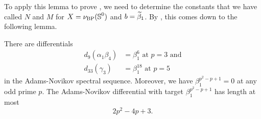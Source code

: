 


To apply this lemma to prove , we need to determine the constants that we have called $N$ and $M$ for $X = \nu_{\mathrm{BP}} (\operatorname{\mathbb{S}}^0)$ and $b = \wt{\beta}_1$. By , this comes down to the following lemma. 

\begin{lem}[Ravenel]\label{lemm:beta1-values}
    There are differentials
    \begin{align*}
        d_9 (\alpha_1 \beta_4) &= \beta_1 ^6 \text{ at } p=3 \text{ and} \\
        d_{33} (\gamma_3) &= \beta_1 ^{18} \text{ at } p=5
    \end{align*}
    in the Adams-Novikov spectral sequence. Moreover, we have 
    $\beta_1 ^{p^2-p+1} = 0$
    at any odd prime $p$. The Adams-Novikov differential with target $\beta_1 ^{p^2-p+1}$ has length at most
    $$2p^2 - 4p + 3. $$
\end{lem}

